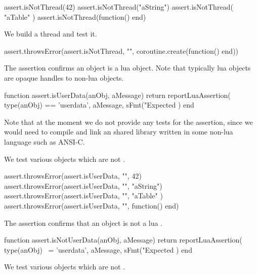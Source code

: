 \startLuaTest
  assert.isNotThread(42)
  assert.isNotThread("aString")
  assert.isNotThread({ "aTable" })
  assert.isNotThread(function() end)
\stopLuaTest
\stopTestCase


We build a thread and test it.

\startLuaTest
  assert.throwsError(assert.isNotThread, "",
    coroutine.create(function() end))
\stopLuaTest
\stopTestCase

\stopTestSuite


The  assertion confirms an object is a lua 
 object. Note that typically lua  objects 
are opaque handles to non-lua objects. 

\startLuaCode
function assert.isUserData(anObj, aMessage)
  return reportLuaAssertion(
    type(anObj) == 'userdata',
    aMessage,
    sFmt("Expected %
  )
end
\stopLuaCode

Note that at the moment we do not provide any  tests for 
the  assertion, since we would need to compile and 
link an shared library written in some non-lua language such as ANSI-C. 


We test various objects which are not .

\startLuaTest
  assert.throwsError(assert.isUserData, "", 42)
  assert.throwsError(assert.isUserData, "", "aString")
  assert.throwsError(assert.isUserData, "", { "aTable" })
  assert.throwsError(assert.isUserData, "", function() end)
\stopLuaTest
\stopTestCase

\stopTestSuite

\godown[2ex]
The  assertion confirms that an object is not a 
lua . 


\startLuaCode
function assert.isNotUserData(anObj, aMessage)
  return reportLuaAssertion(
    type(anObj) ~= 'userdata',
    aMessage,
    sFmt("Expected %
  )
end
\stopLuaCode


We test various objects which are not .

